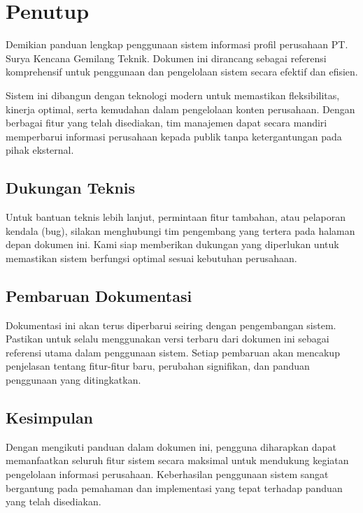 \documentclass[12pt,a4paper]{report}
\begin{document}
\chapter{Penutup}

Demikian panduan lengkap penggunaan sistem informasi profil perusahaan PT. Surya Kencana Gemilang Teknik. Dokumen ini dirancang sebagai referensi komprehensif untuk penggunaan dan pengelolaan sistem secara efektif dan efisien.

Sistem ini dibangun dengan teknologi modern untuk memastikan fleksibilitas, kinerja optimal, serta kemudahan dalam pengelolaan konten perusahaan. Dengan berbagai fitur yang telah disediakan, tim manajemen dapat secara mandiri memperbarui informasi perusahaan kepada publik tanpa ketergantungan pada pihak eksternal.

\section{Dukungan Teknis}
Untuk bantuan teknis lebih lanjut, permintaan fitur tambahan, atau pelaporan kendala (bug), silakan menghubungi tim pengembang yang tertera pada halaman depan dokumen ini. Kami siap memberikan dukungan yang diperlukan untuk memastikan sistem berfungsi optimal sesuai kebutuhan perusahaan.

\section{Pembaruan Dokumentasi}
Dokumentasi ini akan terus diperbarui seiring dengan pengembangan sistem. Pastikan untuk selalu menggunakan versi terbaru dari dokumen ini sebagai referensi utama dalam penggunaan sistem. Setiap pembaruan akan mencakup penjelasan tentang fitur-fitur baru, perubahan signifikan, dan panduan penggunaan yang ditingkatkan.

\section{Kesimpulan}
Dengan mengikuti panduan dalam dokumen ini, pengguna diharapkan dapat memanfaatkan seluruh fitur sistem secara maksimal untuk mendukung kegiatan pengelolaan informasi perusahaan. Keberhasilan penggunaan sistem sangat bergantung pada pemahaman dan implementasi yang tepat terhadap panduan yang telah disediakan.
\end{document}
